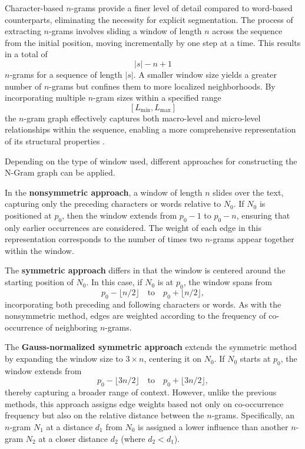 \documentclass{article}
\begin{document}
Character-based \( n \)-grams provide a finer level of detail compared to word-based counterparts, eliminating the necessity for explicit segmentation. The process of extracting \( n \)-grams involves sliding a window of length \( n \) across the sequence from the initial position, moving incrementally by one step at a time. This results in a total of 
\[
|s| - n + 1
\]
\( n \)-grams for a sequence of length \( |s| \). A smaller window size yields a greater number of \( n \)-grams but confines them to more localized neighborhoods. By incorporating multiple \( n \)-gram sizes within a specified range 
\[
[L_{\min}, L_{\max}]
\]
the \( n \)-gram graph effectively captures both macro-level and micro-level relationships within the sequence, enabling a more comprehensive representation of its structural properties \cite{gialitsis2023}.

Depending on the type of window used, different approaches for constructing the N-Gram graph can be applied.

In the \textbf{nonsymmetric approach}, a window of length \( n \) slides over the text, capturing only the preceding characters or words relative to \( N_0 \). If \( N_0 \) is positioned at \( p_0 \), then the window extends from \( p_0 - 1 \) to \( p_0 - n \), ensuring that only earlier occurrences are considered. The weight of each edge in this representation corresponds to the number of times two \( n \)-grams appear together within the window.

The \textbf{symmetric approach} differs in that the window is centered around the starting position of \( N_0 \). In this case, if \( N_0 \) is at \( p_0 \), the window spans from 
\[
p_0 - \lfloor n/2 \rfloor \quad \text{to} \quad p_0 + \lfloor n/2 \rfloor,
\]
incorporating both preceding and following characters or words. As with the nonsymmetric method, edges are weighted according to the frequency of co-occurrence of neighboring \( n \)-grams.

The \textbf{Gauss-normalized symmetric approach} extends the symmetric method by expanding the window size to \( 3 \times n \), centering it on \( N_0 \). If \( N_0 \) starts at \( p_0 \), the window extends from 
\[
p_0 - \lfloor 3n/2 \rfloor \quad \text{to} \quad p_0 + \lfloor 3n/2 \rfloor,
\]
thereby capturing a broader range of context. However, unlike the previous methods, this approach assigns edge weights based not only on co-occurrence frequency but also on the relative distance between the \( n \)-grams. Specifically, an \( n \)-gram \( N_1 \) at a distance \( d_1 \) from \( N_0 \) is assigned a lower influence than another \( n \)-gram \( N_2 \) at a closer distance \( d_2 \) (where \( d_2 < d_1 \)). \cite{giannakopoulos2008summarization}
\end{document}

